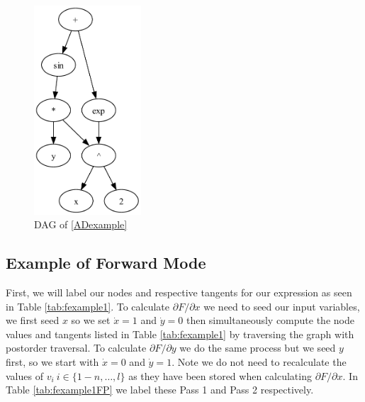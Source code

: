 \documentclass{article}
\begin{document}
\begin{figure}[h!]
    \includegraphics[width=4cm]{images/Graph_Example2.pdf}
    \caption{DAG of \eqref{ADexample}}
    \label{fig:DAGgraph}
\end{figure}

\subsection{Example of Forward Mode}

First, we will label our nodes and respective tangents for our expression as seen in Table \ref{tab:fexample1}. To calculate $\partial F / \partial x$ we need to seed our input variables, we first seed $x$ so we set $\dot{x}=1$ and $\dot{y}=0$ then simultaneously compute the node values and tangents listed in Table \ref{tab:fexample1} by traversing the graph with postorder traversal. To calculate $\partial F / \partial y$ we do the same process but we seed $y$ first, so we start with $\dot{x}=0$ and $\dot{y}=1$. Note we do not need to recalculate the values of $v_i \ i \in \{1-n, \ldots, l \}$ as they have been stored when calculating $\partial F / \partial x$. In Table \ref{tab:fexample1FP} we label these Pass 1 and Pass 2 respectively.
\end{document}
